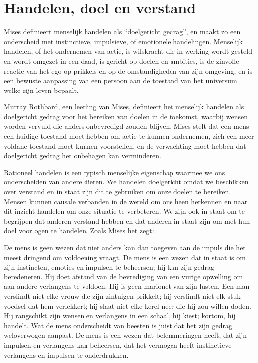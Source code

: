 \section{Handelen, doel en verstand}

Mises definieert menselijk handelen als ``doelgericht gedrag'', en maakt zo een onderscheid met instinctieve, impulsieve, of emotionele handelingen.\autocite{2} Menselijk handelen, of het ondernemen van actie, is wilskracht die in werking wordt gesteld en wordt omgezet in een daad, is gericht op doelen en ambities, is de zinvolle reactie van het ego op prikkels en op de omstandigheden van zijn omgeving, en is een bewuste aanpassing van een persoon aan de toestand van het universum welke zijn leven bepaalt.

Murray Rothbard, een leerling van Mises, definieert het menselijk handelen als doelgericht gedrag voor het bereiken van doelen in de toekomst, waarbij wensen worden vervuld die anders onbevredigd zouden blijven.\autocite{3} Mises stelt dat een mens een huidige toestand moet hebben om actie te kunnen ondernemen, zich een meer voldane toestand moet kunnen voorstellen, en de verwachting moet hebben dat doelgericht gedrag het onbehagen kan verminderen.\autocite{4}

Rationeel handelen is een typisch menselijke eigenschap waarmee we ons onderscheiden van andere dieren. We handelen doelgericht omdat we beschikken over verstand en in staat zijn dit te gebruiken om onze doelen te bereiken. Mensen kunnen causale verbanden in de wereld om ons heen herkennen en naar dit inzicht handelen om onze situatie te verbeteren. We zijn ook in staat om te begrijpen dat anderen verstand hebben en dat anderen in staat zijn om met hun doel voor ogen te handelen. Zoals Mises het zegt:

\begin{blockquotebox}De mens is geen wezen dat niet anders kan dan toegeven aan de impuls die het meest dringend om voldoening vraagt. De mens is een wezen dat in staat is om zijn instincten, emoties en impulsen te beheersen; hij kan zijn gedrag beredeneren. Hij doet afstand van de bevrediging van een vurige opwelling om aan andere verlangens te voldoen. Hij is geen marionet van zijn lusten. Een man verslindt niet elke vrouw die zijn zintuigen prikkelt; hij verslindt niet elk stuk voedsel dat hem verlekkert; hij slaat niet elke kerel neer die hij zou willen doden. Hij rangschikt zijn wensen en verlangens in een schaal, hij kiest; kortom, hij handelt. Wat de mens onderscheidt van beesten is juist dat het zijn gedrag weloverwogen aanpast. De mens is een wezen dat belemmeringen heeft, dat zijn impulsen en verlangens kan beheersen, dat het vermogen heeft instinctieve verlangens en impulsen te onderdrukken.\footnotemark 
\end{blockquotebox}
\autocite{5}

